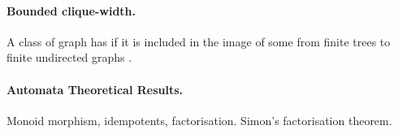 \paragraph*{Bounded clique-width.} A class of graph has  if it is included in the image of some 
from finite trees to finite undirected graphs \cite{COUR91}.

\paragraph*{Automata Theoretical Results.} 
Monoid morphism, idempotents,
factorisation. Simon's factorisation theorem.






